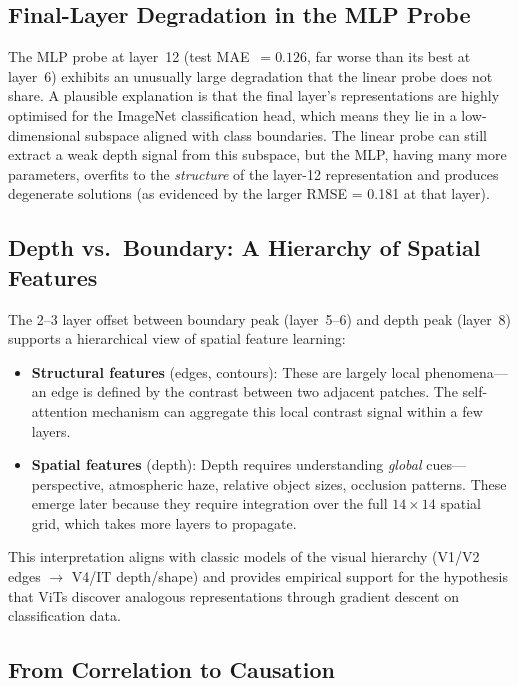 \documentclass[11pt,a4paper]{article}
\begin{document}
\subsection{Final-Layer Degradation in the MLP Probe}

The MLP probe at layer~12 (test MAE~$=0.126$, far worse than its best
at layer~6) exhibits an unusually large degradation that the linear probe
does not share.  A plausible explanation is that the final layer's
representations are highly optimised for the ImageNet classification head,
which means they lie in a low-dimensional subspace aligned with class
boundaries.  The linear probe can still extract a weak depth signal from
this subspace, but the MLP, having many more parameters, overfits to the
\emph{structure} of the layer-12 representation and produces degenerate
solutions (as evidenced by the larger RMSE = 0.181 at that layer).

\subsection{Depth vs.\ Boundary: A Hierarchy of Spatial Features}

The 2--3 layer offset between boundary peak (layer~5--6) and depth peak
(layer~8) supports a hierarchical view of spatial feature learning:
\begin{itemize}[noitemsep]
    \item \textbf{Structural features} (edges, contours): These are largely
          local phenomena---an edge is defined by the contrast between two
          adjacent patches.  The self-attention mechanism can aggregate this
          local contrast signal within a few layers.
    \item \textbf{Spatial features} (depth): Depth requires understanding
          \emph{global} cues---perspective, atmospheric haze, relative
          object sizes, occlusion patterns.  These emerge later because they
          require integration over the full $14\!\times\!14$ spatial grid,
          which takes more layers to propagate.
\end{itemize}
This interpretation aligns with classic models of the visual hierarchy
(V1/V2 edges $\to$ V4/IT depth/shape) and provides empirical support for
the hypothesis that ViTs discover analogous representations through
gradient descent on classification data.

\subsection{From Correlation to Causation}
\end{document}
